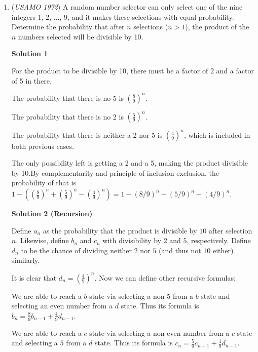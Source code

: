 \begin{enumerate}
 <i>Alternate solutions are always welcome. If you have a different, elegant solution to this problem, please \href{https://artofproblemsolving.com/wiki/index.php?title=1972\_USAMO\_Problems/Problem\_2&action=edit}{add it} to this page.</i>



	\item (\textit{USAMO 1972}) A random number selector can only select one of the nine integers 1, 2, ..., 9, and it makes these selections with equal probability. Determine the probability that after $n$ selections ($n>1$), the product of the $n$ numbers selected will be divisible by 10.


 



\textbf{Solution 1}

For the product to be divisible by 10, there must be a factor of 2 and a factor of 5 in there.

 The probability that there is no 5 is $\left( \frac{8}{9}\right)^n$.

 The probability that there is no 2 is $\left( \frac{5}{9}\right)^n$.

 The probability that there is neither a 2 nor 5 is $\left( \frac{4}{9}\right)^n$, which is included in both previous cases. 

 The only possibility left is getting a 2 and a 5, making the product divisible by 10.By complementarity and principle of inclusion-exclusion, the probability of that is $1- \left( \left( \frac{8}{9}\right)^n + \left( \frac{5}{9}\right)^n - \left( \frac{4}{9}\right)^n\right)=\boxed{1-(8/9)^n-(5/9)^n+(4/9)^n}$.

 



\textbf{Solution 2 (Recursion)}

Define $a_n$ as the probability that the product is divisible by $10$ after selection $n$. Likewise, define $b_n$ and $c_n$ with divisibility by $2$ and $5$, respectively. Define $d_n$ to be the chance of dividing neither $2$ nor $5$ (and thus not $10$ either) similarly.

 It is clear that $d_n=\left(\frac{4}{9}\right)^n$. Now we can define other recursive formulas:

 We are able to reach a $b$ state via selecting a non-$5$ from a $b$ state and selecting an even number from a $d$ state. Thus its formula is $b_n=\frac{8}{9}b_{n-1}+\frac{4}{9}d_{n-1}$.

 We are able to reach a $c$ state via selecting a non-even number from a $c$ state and selecting a $5$ from a $d$ state. Thus its formula is $c_n=\frac{5}{9}c_{n-1}+\frac{1}{9}d_{n-1}$.


\end{enumerate}
